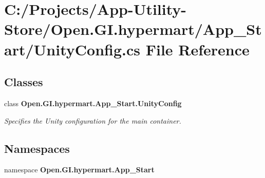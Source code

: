 \section{C\+:/\+Projects/\+App-\/\+Utility-\/\+Store/\+Open.G\+I.\+hypermart/\+App\+\_\+\+Start/\+Unity\+Config.cs File Reference}
\label{_unity_config_8cs}
\subsection*{Classes}
\begin{DoxyCompactItemize}
\item 
class \textbf{ Open.\+G\+I.\+hypermart.\+App\+\_\+\+Start.\+Unity\+Config}
\begin{DoxyCompactList}\small\item\em Specifies the Unity configuration for the main container. \end{DoxyCompactList}\end{DoxyCompactItemize}
\subsection*{Namespaces}
\begin{DoxyCompactItemize}
\item 
namespace \textbf{ Open.\+G\+I.\+hypermart.\+App\+\_\+\+Start}
\end{DoxyCompactItemize}
